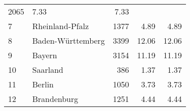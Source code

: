 \begin{longtable}{lXrrr}
       \num{2065} &
       \num[round-mode=places,round-precision=2]{7.33} &
         \num[round-mode=places,round-precision=2]{7.33} \\

     7 &
     \multicolumn{1}{X}{ Rheinland-Pfalz   } &


       \num{1377} &
       \num[round-mode=places,round-precision=2]{4.89} &
         \num[round-mode=places,round-precision=2]{4.89} \\

     8 &
     \multicolumn{1}{X}{ Baden-Württemberg   } &


       \num{3399} &
       \num[round-mode=places,round-precision=2]{12.06} &
         \num[round-mode=places,round-precision=2]{12.06} \\

     9 &
     \multicolumn{1}{X}{ Bayern   } &


       \num{3154} &
       \num[round-mode=places,round-precision=2]{11.19} &
         \num[round-mode=places,round-precision=2]{11.19} \\

     10 &
     \multicolumn{1}{X}{ Saarland   } &


       \num{386} &
       \num[round-mode=places,round-precision=2]{1.37} &
         \num[round-mode=places,round-precision=2]{1.37} \\

     11 &
     \multicolumn{1}{X}{ Berlin   } &


       \num{1050} &
       \num[round-mode=places,round-precision=2]{3.73} &
         \num[round-mode=places,round-precision=2]{3.73} \\

     12 &
     \multicolumn{1}{X}{ Brandenburg   } &


       \num{1251} &
       \num[round-mode=places,round-precision=2]{4.44} &
         \num[round-mode=places,round-precision=2]{4.44} \\


\end{longtable}
